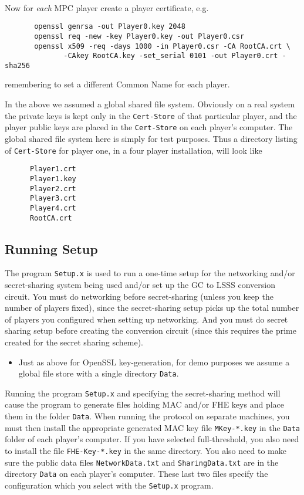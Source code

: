 ~~

\noindent
Now for {\em each} MPC player create a player certificate, e.g.
\begin{verbatim}
       openssl genrsa -out Player0.key 2048
       openssl req -new -key Player0.key -out Player0.csr
       openssl x509 -req -days 1000 -in Player0.csr -CA RootCA.crt \
              -CAkey RootCA.key -set_serial 0101 -out Player0.crt -sha256
\end{verbatim}
remembering to set a different Common Name for each player.

In the above we assumed a global shared file system.  Obviously on
a real system the private keys is kept only in the
\verb+Cert-Store+ of that particular player, and the player public
keys are placed in the \verb+Cert-Store+ on each player's
computer. The global shared file system here is simply for test
purposes. Thus a directory listing of \verb+Cert-Store+
for player one, in a four player installation, will look like
\begin{verbatim}
      Player1.crt
      Player1.key
      Player2.crt
      Player3.crt
      Player4.crt
      RootCA.crt
\end{verbatim}


\subsection{Running Setup}
The program \verb+Setup.x+ is used to run a one-time setup
for the networking and/or secret-sharing system being used
and/or set up the GC to LSSS conversion circuit.
You must do networking before secret-sharing (unless you keep
the number of players fixed), since the secret-sharing setup
picks up the total number of players you configured when setting
up networking.
And you must do secret sharing setup before creating the conversion
circuit (since this requires the prime created for the secret
sharing scheme).
\begin{itemize}
\item Just as above for OpenSSL key-generation, for demo purposes we assume
a global file store with a single directory \verb+Data+.
\end{itemize}
Running the program \verb+Setup.x+ and specifying the secret-sharing
method will cause the program to generate files holding MAC and/or FHE
keys and place them in the folder \verb+Data+.  When running the
protocol on separate machines, you must then install the appropriate
generated MAC key file \verb+MKey-*.key+ in the \verb+Data+ folder of
each player's computer.  If you have selected full-threshold, you also
need to install the file \verb+FHE-Key-*.key+ in the same directory.
You also need to make sure the public data files
\verb+NetworkData.txt+ and \verb+SharingData.txt+ are in the directory
\verb+Data+ on each player's computer.
These last two files specify the configuration which you select with
the \verb+Setup.x+ program.

